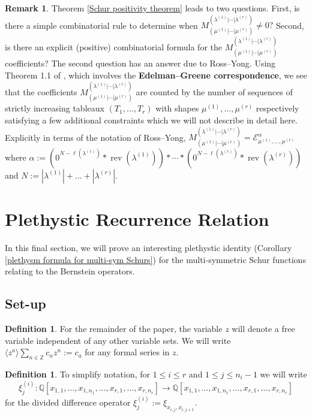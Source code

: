 \documentclass[12pt,reqno]{amsart}
\theoremstyle{definition}
\newtheorem{defn}[thm]{Definition}
\newtheorem{remark}{Remark}
\DeclareMathOperator{\rev}{rev}
\begin{document}
\begin{remark}\label{LR remark}
    Theorem \ref{Schur positivity theorem} leads to two questions. First, is there a simple combinatorial rule to determine when $M_{(\mu^{(1)}|\cdots | \mu^{(r)})}^{(\lambda^{(1)}|\cdots | \lambda^{(r)})} \neq 0?$ Second, is there an explicit (positive) combinatorial formula for the $M_{(\mu^{(1)}|\cdots | \mu^{(r)})}^{(\lambda^{(1)}|\cdots | \lambda^{(r)})}$ coefficients? The second question has an answer due to Ross--Yong. Using Theorem 1.1 of \cite{RY15}, which involves the \textbf{Edelman--Greene correspondence}, we see that the coefficients $M_{(\mu^{(1)}|\cdots | \mu^{(r)})}^{(\lambda^{(1)}|\cdots | \lambda^{(r)})}$ are counted by the number of sequences of strictly increasing tableaux $(T_1,\dots,T_r)$ with shapes $\mu^{(1)},\dots, \mu^{(r)}$ respectively satisfying a few additional constraints which we will not describe in detail here. Explicitly in terms of the notation of Ross--Yong, $M_{(\mu^{(1)}|\cdots | \mu^{(r)})}^{(\lambda^{(1)}|\cdots | \lambda^{(r)})} = \mathcal{E}^{\alpha}_{\mu^{(1)},\dots, \mu^{(r)}}$ where 
    $\alpha:= (0^{N-\ell(\lambda^{(1)})}*\rev(\lambda^{(1)}))*\cdots * (0^{N-\ell(\lambda^{(r)})}*\rev(\lambda^{(r)}))$ and $N:= |\lambda^{(1)}|+\dots + |\lambda^{(r)}|.$ 
\end{remark}


\section{Plethystic Recurrence Relation}

In this final section, we will prove an interesting plethystic identity (Corollary \ref{plethysm formula for multi-sym Schurs}) for the multi-symmetric Schur functions relating to the Bernstein operators. 

\subsection{Set-up}

\begin{defn}
For the remainder of the paper, the variable $z$ will denote a free variable independent of any other variable sets. We will write $\langle z^a \rangle \sum_{n \in \mathbb{Z}} c_n z^n:= c_a$ for any formal series in $z.$ 
\end{defn}

 

\begin{defn}
 To simplify notation, for $1\leq i \leq r$ and $1\leq j \leq n_{i}-1$ we will write $$\xi^{(i)}_{j}: \mathbb{Q}[x_{1,1},\ldots,x_{1,n_1},\ldots,x_{r,1},\ldots,x_{r,n_r}] \rightarrow \mathbb{Q}[x_{1,1},\ldots,x_{1,n_1},\ldots,x_{r,1},\ldots,x_{r,n_r}]$$ for the divided difference operator $\xi^{(i)}_j:= \xi_{x_{i,j},x_{i,j+1}}.$ 
\end{defn}
\end{document}
